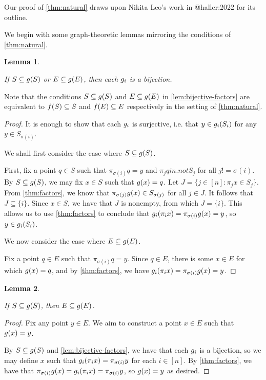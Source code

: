 \documentclass{amsart}
\newtheorem{lemma}{Lemma}
\theoremstyle{definition}
\begin{document}
Our proof of \autoref{thm:natural} draws upon Nikita Leo's work in @haller:2022
for its outline.

We begin with some graph-theoretic lemmas mirroring the conditions of \autoref{thm:natural}.

\begin{lemma} \label{lem:bijective-factors}

  If $S \subseteq g(S)$ or $E \subseteq g(E)$, then each $g_i$ is a bijection.
\end{lemma}

Note that the conditions $S \subseteq g(S)$ and $E \subseteq g(E)$ in \autoref{lem:bijective-factors} are equivalent to $f(S) \subseteq S$ and $f(E) \subseteq E$ respectively in the setting of \autoref{thm:natural}.

\begin{proof} 

  It is enough to show that each $g_i$ is surjective, i.e. that $y \in g_i (S_i)$ for any $y \in S_{\sigma(i)}$.

  We shall first consider the case where $S \subseteq g(S)$.

  First, fix a point $q \in S$ such that $\pi_{\sigma(i)} q = y$ and $\pi_j q in.not S_j$ for all $j != \sigma(i)$. By $S \subseteq g(S)$, we may fix $x \in S$ such that $g(x) = q$. Let $J = \{j \in [n] \colon \pi_j x \in S_j\}$. From  \autoref{thm:factors}, we know that $\pi_{\sigma(j)} g(x) \in S_{\sigma(j)}$ for all $j \in J$. It follows that $J \subseteq \{i\}$. Since $x \in S$, we have that $J$ is nonempty, from which $J = \{i\}$. This allows us to use  \autoref{thm:factors} to conclude that $g_i (\pi_i x) = \pi_{\sigma(i)} g(x) = y$, so $y \in g_i (S_i)$.

  We now consider the case where $E \subseteq g(E)$.

  Fix a point $q \in E$ such that $\pi_{\sigma(i)} q = y$. Since $q \in E$, there is some $x \in E$ for which $g(x) = q$, and by  \autoref{thm:factors}, we have $g_i (\pi_i x) = \pi_{\sigma(i)} g(x) = y$.
\end{proof}


\begin{lemma} \label{lem:sphere-implies-extreme}

  If $S \subseteq g(S)$, then $E \subseteq g(E)$.
\end{lemma}

\begin{proof} 

  Fix any point $y \in E$. We aim to construct a point $x \in E$ such that $g(x)=y$.

  By $S \subseteq g(S)$ and \autoref{lem:bijective-factors}, we have that each $g_i$ is a bijection, so we may define $x$ such that $g_i (\pi_i x) = \pi_{\sigma(i)} y$ for each $i \in [n]$. By  \autoref{thm:factors}, we have that $\pi_{\sigma(i)} g(x) = g_i (\pi_i x) = \pi_{\sigma(i)} y$, so $g(x) = y$ as desired.
\end{proof}
\end{document}
